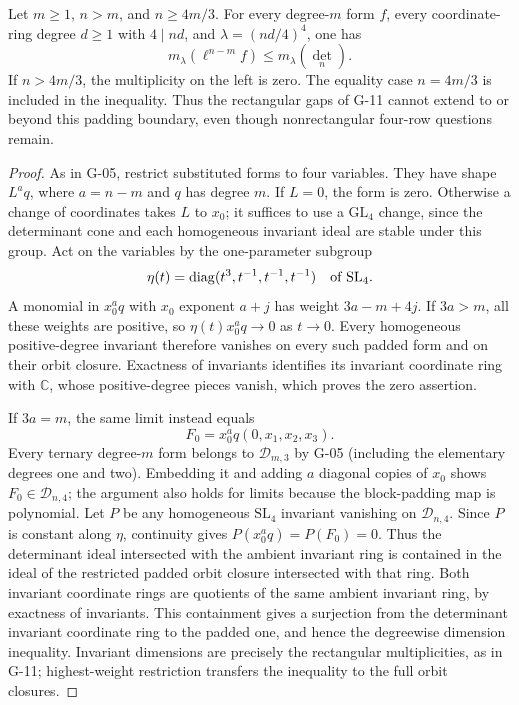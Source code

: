 \begin{proposition}\label{G-12}
Let $m\geq1$, $n>m$, and $n\geq4m/3$. For every degree-$m$
form $f$, every coordinate-ring degree $d\geq1$ with
$4\mid nd$, and $\lambda=(nd/4)^4$, one has
\begin{equation}\label{G12:exclusion}
 m_\lambda(\ell^{n-m}f)\leq m_\lambda(\det_n).
\end{equation}
If $n>4m/3$, the multiplicity on the left is zero.
The equality case $n=4m/3$ is included in the inequality.
Thus the rectangular gaps of G-11 cannot extend to or beyond
this padding boundary, even though nonrectangular four-row
questions remain.
\end{proposition}
\begin{proof}
As in G-05, restrict substituted forms to four variables.
They have shape $L^a q$, where $a=n-m$ and $q$ has degree
$m$. If $L=0$, the form is zero. Otherwise a change of
coordinates takes $L$ to $x_0$; it suffices to use a
$\mathrm{GL}_4$ change, since the determinant cone and each
homogeneous invariant ideal are stable under this group.
Act on the variables by the one-parameter subgroup
\[
 \eta(t)=\operatorname{diag}(t^3,t^{-1},t^{-1},t^{-1})
 \quad\hbox{of }\mathrm{SL}_4.
\]
A monomial in $x_0^a q$ with $x_0$ exponent $a+j$ has
weight $3a-m+4j$. If $3a>m$, all these weights are positive,
so $\eta(t)x_0^a q\longrightarrow0$ as $t\longrightarrow0$.
Every homogeneous positive-degree invariant therefore
vanishes on every such padded form and on their orbit
closure. Exactness of invariants identifies its invariant
coordinate ring with $\mathbb C$, whose positive-degree pieces vanish,
which proves the zero assertion.

If $3a=m$, the same limit instead equals
\[
 F_0=x_0^a q(0,x_1,x_2,x_3).
\]
Every ternary degree-$m$ form belongs to $\mathcal D_{m,3}$
by G-05 (including the elementary degrees one and two).
Embedding it and adding $a$ diagonal copies of $x_0$
shows $F_0\in\mathcal D_{n,4}$; the argument also holds for
limits because the block-padding map is polynomial.
Let $P$ be any homogeneous $\mathrm{SL}_4$ invariant
vanishing on $\mathcal D_{n,4}$. Since $P$ is constant
along $\eta$, continuity gives
$P(x_0^a q)=P(F_0)=0$. Thus the determinant ideal intersected
with the ambient invariant ring is contained in the ideal
of the restricted padded orbit closure intersected with
that ring. Both invariant coordinate rings are quotients
of the same ambient invariant ring, by exactness of
invariants. This containment gives a surjection from the
determinant invariant coordinate ring to the padded one,
and hence the degreewise dimension inequality.
Invariant dimensions are precisely the rectangular
multiplicities, as in G-11; highest-weight restriction
transfers the inequality to the full orbit closures.
\end{proof}
